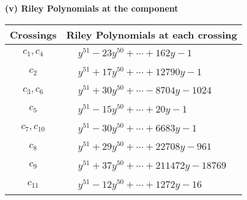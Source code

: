 \documentclass[1p]{elsarticle_modified}
\theoremstyle{definition}
\begin{document}
\newpage\renewcommand{\arraystretch}{1}
\flushleft \textbf{(v) Riley Polynomials at the component}\newline \\
\begin{tabular}{m{50pt}|m{274pt}}
Crossings & \hspace{64pt}Riley Polynomials at each crossing \\
\hline $$\begin{aligned}c_{1},c_{4}\end{aligned}$$&$\begin{aligned}
&y^{51}-23 y^{50}+\cdots+162 y-1
\end{aligned}$\\
\hline $$\begin{aligned}c_{2}\end{aligned}$$&$\begin{aligned}
&y^{51}+17 y^{50}+\cdots+12790 y-1
\end{aligned}$\\
\hline $$\begin{aligned}c_{3},c_{6}\end{aligned}$$&$\begin{aligned}
&y^{51}+30 y^{50}+\cdots-8704 y-1024
\end{aligned}$\\
\hline $$\begin{aligned}c_{5}\end{aligned}$$&$\begin{aligned}
&y^{51}-15 y^{50}+\cdots+20 y-1
\end{aligned}$\\
\hline $$\begin{aligned}c_{7},c_{10}\end{aligned}$$&$\begin{aligned}
&y^{51}-30 y^{50}+\cdots+6683 y-1
\end{aligned}$\\
\hline $$\begin{aligned}c_{8}\end{aligned}$$&$\begin{aligned}
&y^{51}+29 y^{50}+\cdots+22708 y-961
\end{aligned}$\\
\hline $$\begin{aligned}c_{9}\end{aligned}$$&$\begin{aligned}
&y^{51}+37 y^{50}+\cdots+211472 y-18769
\end{aligned}$\\
\hline $$\begin{aligned}c_{11}\end{aligned}$$&$\begin{aligned}
&y^{51}-12 y^{50}+\cdots+1272 y-16
\end{aligned}$\\
\hline
\end{tabular}\\~\\
\end{document}
